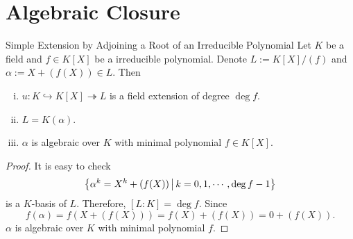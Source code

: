 \section{Algebraic Closure}

\begin{proposition}{Simple Extension by Adjoining a Root of an Irreducible Polynomial}{}
    Let $K$ be a field and $f\in K[X]$ be a irreducible polynomial. Denote $L:=K[X]/(f)$ and $\alpha:=X+(f(X))\in L$. Then
    \begin{enumerate}[(i)]
        \item $u:K\hookrightarrow K[X]\twoheadrightarrow L$ is a field extension of degree $\deg f$.
        \item $L=K(\alpha)$.
        \item $\alpha$ is algebraic over $K$ with minimal polynomial $f\in K[X]$.
    \end{enumerate}  
\end{proposition}
\begin{proof}
    It is easy to check 
    \[
    \left\{\alpha^k=X^k+(f(X))\,\middle\vert\, k=0,1,\cdots, \deg f-1\right\}
    \]
    is a $K$-basis of $L$. Therefore, $[L:K]=\deg f$. Since 
    \[
        f(\alpha)=f(X+(f(X)))=f(X)+(f(X))=0+(f(X)).
    \]
    $\alpha$ is algebraic over $K$ with minimal polynomial $f$.
\end{proof}

